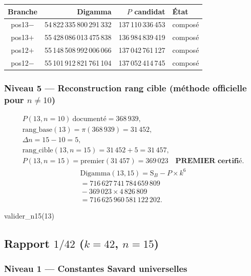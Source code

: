 \documentclass[11pt,a4paper]{article}
\newcommand{\SB}{\mathrm{S}_B}
\begin{document}
\begin{center}\small
\begin{tabular}{@{}c r r l@{}}
\toprule
\rowcolor{spectralgris}
Branche & Digamma & $P$ candidat & État \\
\midrule
pos13$-$ & 54\,822\,335\,800\,291\,332 & 137\,110\,336\,453 & composé \\
pos13$+$ & 55\,428\,086\,013\,475\,838 & 136\,984\,839\,419 & composé \\
pos12$+$ & 55\,148\,508\,992\,006\,066 & 137\,042\,761\,127 & composé \\
pos12$-$ & 55\,101\,912\,821\,761\,104 & 137\,052\,414\,745 & composé \\
\bottomrule
\end{tabular}
\end{center}

\subsubsection{Niveau 5 --- Reconstruction rang cible (méthode officielle pour \texorpdfstring{$n \neq 10$}{n != 10})}
\begin{gather*}
P(13,n{=}10)\ \text{documenté}=368\,939,\\
\text{rang\_base}(13)=\pi(368\,939)=31\,452,\\
\Delta n=15-10=5,\\
\text{rang\_cible}(13,n{=}15)=31\,452+5=31\,457,\\
P(13,n{=}15)=\text{premier}(31\,457)=369\,023
\quad\textbf{PREMIER certifié}.
\end{gather*}
\begin{multline*}
\text{Digamma}(13,15)=\SB-P\times k^{6}\\
=716\,627\,741\,784\,659\,809\\
{}-369\,023\times4\,826\,809\\
=716\,625\,960\,581\,122\,202.
\end{multline*}

\begin{pycode}
valider_n15(13)
\end{pycode}

\subsection{Rapport \texorpdfstring{$1/42$}{1/42} (\texorpdfstring{$k = 42$}{k = 42}, \texorpdfstring{$n = 15$}{n = 15})}
\subsubsection{Niveau 1 --- Constantes Savard universelles}
\end{document}
